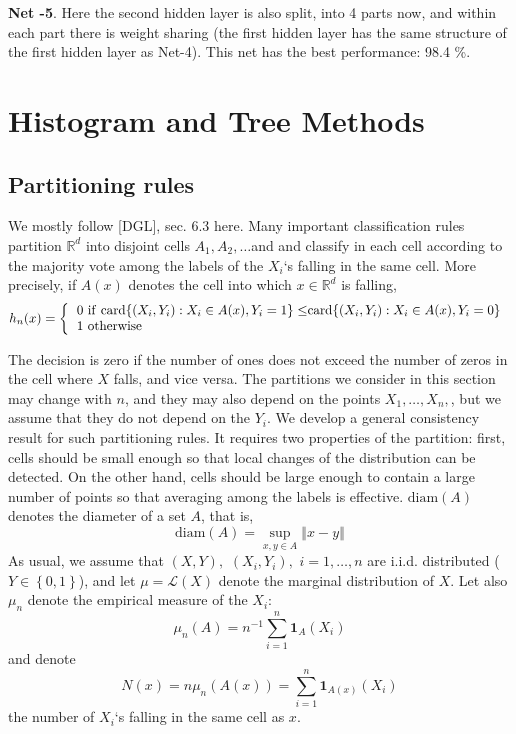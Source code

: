 \documentclass[11pt,twoside]{article}%
\theoremstyle{change}
\begin{document}
\bigskip

\textbf{Net -5}. Here the second hidden layer is also split, into 4 parts now,
and within each part there is weight sharing (the first hidden layer has the
same structure of the first hidden layer as Net-4). This net has the best
performance: 98.4 \%.

\newpage

\section{Histogram and Tree Methods}

\subsection{Partitioning rules}

We mostly follow [DGL], sec. 6.3 here. Many important classification rules
partition $\mathbb{R}^{d}$ into disjoint cells $A_{1},A_{2},\ldots$and and
classify in each cell according to the majority vote among the labels of the
$X_{i}$`s falling in the same cell. More precisely, if $A(x)$ denotes the cell
into which $x\in\mathbb{R}^{d}$ is falling,%
\begin{equation}
h_{n}(x)=\left\{
\begin{tabular}
[c]{l}%
$0$ if \textrm{card}$\left\{  (X_{i},Y_{i}):X_{i}\in A(x),Y_{i}=1\right\}
\leq$\textrm{card}$\left\{  (X_{i},Y_{i}):X_{i}\in A(x),Y_{i}=0\right\}  $\\
$1$ otherwise
\end{tabular}
\right. \label{partition-rule-def}%
\end{equation}


The decision is zero if the number of ones does not exceed the number of zeros
in the cell where $X$ falls, and vice versa. The partitions we consider in
this section may change with $n$, and they may also depend on the points
$X_{1},\ldots,X_{n},$, but we assume that they do not depend on the $Y_{i}$.
We develop a general consistency result for such partitioning rules. It
requires two properties of the partition: first, cells should be small enough
so that local changes of the distribution can be detected. On the other hand,
cells should be large enough to contain a large number of points so that
averaging among the labels is effective. $\mathrm{diam}(A)$ denotes the
diameter of a set $A$, that is,%
\[
\mathrm{diam}(A)=\sup_{x,y\in A}\left\Vert x-y\right\Vert
\]
As usual, we assume that $(X,Y),$ $(X_{i},Y_{i}),$ $i=1,\ldots,n$ are i.i.d.
distributed ($Y\in\left\{  0,1\right\}  $), and let $\mu=\mathcal{L}(X)$
denote the marginal distribution of $X$. Let also $\mu_{n}$ denote the
empirical measure of the $X_{i}$:
\[
\mu_{n}\left(  A\right)  =n^{-1}\sum_{i=1}^{n}\mathbf{1}_{A}(X_{i})
\]
and denote
\[
N(x)=n\mu_{n}\left(  A(x)\right)  =\sum_{i=1}^{n}\mathbf{1}_{A(x)}(X_{i})
\]
the number of $X_{i}$`s falling in the same cell as $x$. \bigskip
\end{document}
